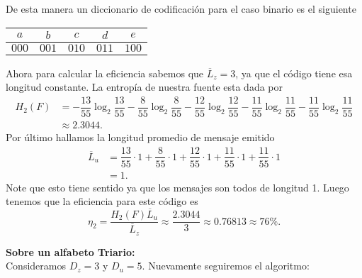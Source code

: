 \begin{sols}
\begin{center}
    \end{center}
De esta manera un diccionario de codificación para el caso binario es el siguiente
\begin{center}
  \begin{tabular}{|c|c|c|c|c|}
  \hline
$a$ & $b$ & $c$ & $d$ & $e$\\
\hline
$000$ & $001$ & $010$ & $011$ & $100$\\
\hline
 \end{tabular}
 \end{center}

Ahora para calcular la eficiencia sabemos que $\overline{L}_z=3$, ya que el código tiene esa longitud constante. La entropía de nuestra fuente esta dada por
\begin{align*}
    H_2(F)&=-\dfrac{13}{55}\log_2\dfrac{13}{55}-\dfrac{8}{55}\log_2\dfrac{8}{55}-\dfrac{12}{55}\log_2\dfrac{12}{55}-\dfrac{11}{55}\log_2\dfrac{11}{55}-\dfrac{11}{55}\log_2\dfrac{11}{55}\\
    &\approx2.3044.
\end{align*}
Por último hallamos la longitud promedio de mensaje emitido
\begin{align*}
   \overline{L}_u&=\dfrac{13}{55}\cdot1+\dfrac{8}{55}\cdot1+\dfrac{12}{55}\cdot1+\dfrac{11}{55}\cdot1+\dfrac{11}{55}\cdot1\\
   &=1. 
\end{align*}
Note que esto tiene sentido ya que los mensajes son todos de longitud 1. Luego tenemos que la eficiencia para este código es
$$\eta_2=\dfrac{H_2(F)\overline{L}_u}{\overline{L}_z}\approx\dfrac{2.3044}{3}\approx0.76813\approx 76\%.$$



\textbf{Sobre un alfabeto Triario:}\\

Consideramos $D_z=3$ y $D_u=5.$ Nuevamente seguiremos el algoritmo:


\end{sols}
